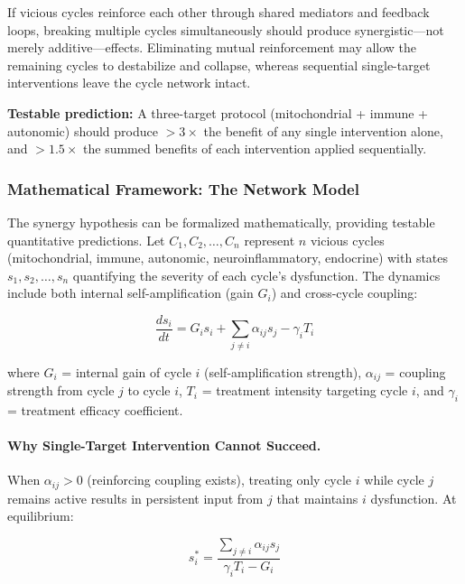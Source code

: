 \begin{keypoint}
If vicious cycles reinforce each other through shared mediators and feedback loops, breaking multiple cycles simultaneously should produce synergistic---not merely additive---effects. Eliminating mutual reinforcement may allow the remaining cycles to destabilize and collapse, whereas sequential single-target interventions leave the cycle network intact.

\textbf{Testable prediction:} A three-target protocol (mitochondrial + immune + autonomic) should produce $>3\times$ the benefit of any single intervention alone, and $>1.5\times$ the summed benefits of each intervention applied sequentially.
\end{keypoint}

\subsubsection{Mathematical Framework: The Network Model}

The synergy hypothesis can be formalized mathematically, providing testable quantitative predictions. Let $C_1, C_2, \ldots, C_n$ represent $n$ vicious cycles (mitochondrial, immune, autonomic, neuroinflammatory, endocrine) with states $s_1, s_2, \ldots, s_n$ quantifying the severity of each cycle's dysfunction. The dynamics include both internal self-amplification (gain $G_i$) and cross-cycle coupling:

\begin{equation}
\frac{ds_i}{dt} = G_i s_i + \sum_{j \neq i} \alpha_{ij} s_j - \gamma_i T_i
\label{eq:cycle-network-dynamics}
\end{equation}

where $G_i$ = internal gain of cycle $i$ (self-amplification strength), $\alpha_{ij}$ = coupling strength from cycle $j$ to cycle $i$, $T_i$ = treatment intensity targeting cycle $i$, and $\gamma_i$ = treatment efficacy coefficient.

\paragraph{Why Single-Target Intervention Cannot Succeed.}

When $\alpha_{ij} > 0$ (reinforcing coupling exists), treating only cycle $i$ while cycle $j$ remains active results in persistent input from $j$ that maintains $i$ dysfunction. At equilibrium:

\begin{equation}
s_i^* = \frac{\sum_{j \neq i} \alpha_{ij} s_j}{\gamma_i T_i - G_i}
\label{eq:equilibrium-single-target}
\end{equation}

